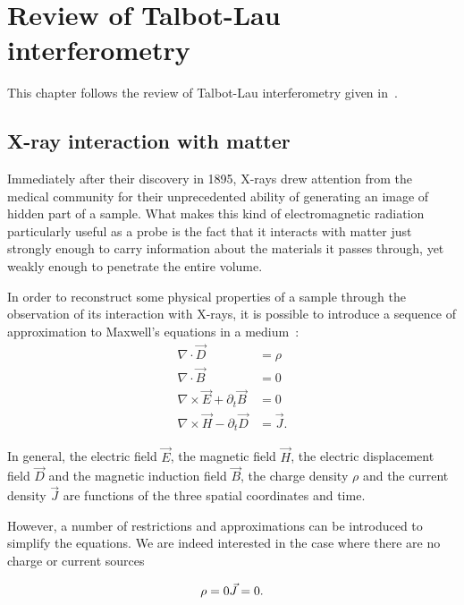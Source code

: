 \chapter{Review of Talbot-Lau interferometry}\label{ch:review}
This chapter follows the review of Talbot-Lau interferometry given in~\cite{galitesina}.

\section{X-ray interaction with matter}
Immediately after their discovery in 1895, X-rays drew attention from the
medical community for their unprecedented ability of generating an image of
hidden part of a sample. What makes this kind of electromagnetic radiation
particularly useful as a probe is the fact that it interacts with matter
just strongly enough to carry information about the materials it passes
through, yet weakly enough to penetrate the entire volume.

In order to reconstruct some physical properties of a sample through the
observation of its interaction with X-rays, it is possible to introduce a
sequence of approximation to Maxwell's equations in a medium~\cite{jackson_classical_1999, Paganin2006b}:
\begin{align}
    \nabla \cdot \vec{D} & = \rho \label{eq:gauss}\\
    \nabla \cdot \vec{B} & = 0 \label{eq:nomonopoles}\\
    \nabla \times \vec{E} + \partial_t \vec{B} & = 0
    \label{eq:induction}\\
    \nabla \times \vec{H} - \partial_t \vec{D} & = \vec{J}
    \label{eq:ampere}.
\end{align}

In general, the electric field $\vec{E}$, the magnetic field $\vec{H}$, the
electric displacement field $\vec{D}$ and the magnetic induction field
$\vec{B}$, the charge density $\rho$ and the current density $\vec{J}$ are
functions of the three spatial coordinates and time. 

However, a number of restrictions and approximations can be introduced to
simplify the equations. We are indeed interested in the case where there are
no charge or current sources

\begin{equation}
    \rho = 0\\
    \vec{J} = 0.
    \label{eq:absentsources}
\end{equation}


